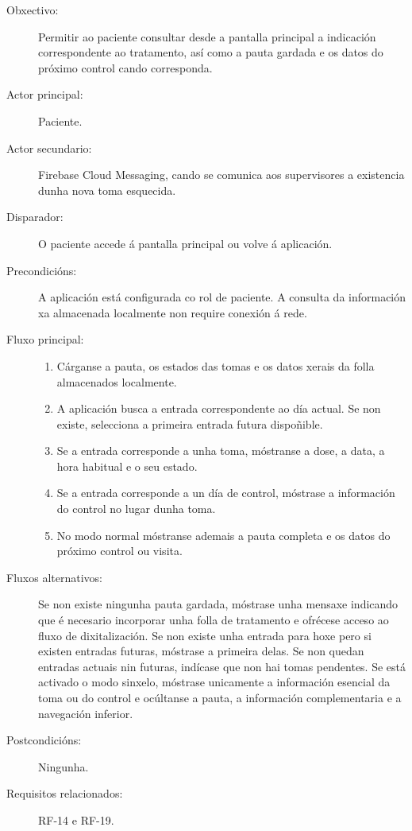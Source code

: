 \begin{description}

\item[Obxectivo:] Permitir ao paciente consultar desde a pantalla principal a
indicación correspondente ao tratamento, así como a pauta gardada e os datos
do próximo control cando corresponda.

\item[Actor principal:] Paciente.

\item[Actor secundario:] Firebase Cloud Messaging, cando se comunica aos
supervisores a existencia dunha nova toma esquecida.

\item[Disparador:] O paciente accede á pantalla principal ou volve á aplicación.

\item[Precondicións:] A aplicación está configurada co rol de paciente. A
consulta da información xa almacenada localmente non require conexión á rede.

\item[Fluxo principal:] \hfill
\begin{enumerate}

    \item Cárganse a pauta, os estados das tomas e os datos xerais da folla
    almacenados localmente.

    \item A aplicación busca a entrada correspondente ao día actual. Se non
    existe, selecciona a primeira entrada futura dispoñible.

    \item Se a entrada corresponde a unha toma, móstranse a dose, a data, a hora
    habitual e o seu estado.

    \item Se a entrada corresponde a un día de control, móstrase a información
    do control no lugar dunha toma.

    \item No modo normal móstranse ademais a pauta completa e os datos do próximo
    control ou visita.
\end{enumerate}

\item[Fluxos alternativos:] Se non existe ningunha pauta gardada, móstrase unha
mensaxe indicando que é necesario incorporar unha folla de tratamento e
ofrécese acceso ao fluxo de dixitalización. Se non existe unha entrada para hoxe
pero si existen entradas futuras, móstrase a primeira delas. Se non quedan
entradas actuais nin futuras, indícase que non hai tomas pendentes. Se está
activado o modo sinxelo, móstrase unicamente a información esencial da toma ou
do control e ocúltanse a pauta, a información complementaria e a navegación
inferior.

\item[Postcondicións:] Ningunha.

\item[Requisitos relacionados:] RF-14 e RF-19.

\end{description}


